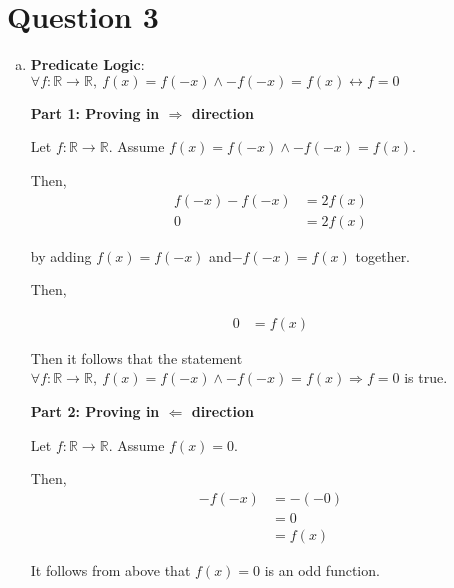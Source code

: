 \documentclass[12pt]{article}
\begin{document}
\section*{Question 3}

\begin{enumerate}[a.]
    \item

    \textbf{Predicate Logic}: $\forall f: \mathbb{R} \to \mathbb{R},\: f(x) = f(-x) \land
    -f(-x) = f(x) \leftrightarrow f = 0$

    \bigbreak

    \textbf{Part 1: Proving in $\Rightarrow$ direction}

    \bigbreak

    Let $f: \mathbb{R} \to \mathbb{R}$. Assume $f(x) = f(-x) \land -f(-x)=f(x)$.

    \bigbreak

    Then,
    \setcounter{equation}{0}
    \begin{align}
        f(-x) - f(-x) &= 2f(x)\\
        0 &= 2f(x)
    \end{align}

    by adding $f(x) = f(-x)$ and$-f(-x) = f(x)$ together.

    \bigbreak

    Then,

    \begin{align}
        0 &= f(x)
    \end{align}

    \bigbreak

    Then it follows that the statement $\forall f: \mathbb{R} \to \mathbb{R},\:
    f(x) = f(-x) \land -f(-x) = f(x) \Rightarrow f = 0$ is true.

    \bigbreak

    \textbf{Part 2: Proving in $\Leftarrow$ direction}

    \bigbreak

    Let $f: \mathbb{R} \to \mathbb{R}$. Assume $f(x) = 0$.

    \bigbreak

    Then,
    \setcounter{equation}{0}
    \begin{align}
        -f(-x) &= -(-0)\\
        &= 0\\
        &= f(x)
    \end{align}

    It follows from above that $f(x) = 0$ is an odd function.


\end{enumerate}
\end{document}
